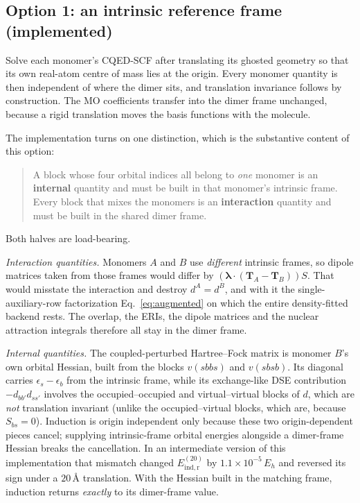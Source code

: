 \documentclass[11pt]{article}
\newcommand{\lam}{\bm{\lambda}}
\begin{document}
\subsection{Option 1: an intrinsic reference frame (implemented)}

Solve each monomer's CQED-SCF after translating its ghosted geometry so that
its own real-atom centre of mass lies at the origin. Every monomer quantity is
then independent of where the dimer sits, and translation invariance follows by
construction. The MO coefficients transfer into the dimer frame unchanged,
because a rigid translation moves the basis functions with the molecule.

The implementation turns on one distinction, which is the substantive content
of this option:

\begin{quote}
A block whose four orbital indices all belong to \emph{one} monomer is an
\textbf{internal} quantity and must be built in that monomer's intrinsic frame.
Every block that mixes the monomers is an \textbf{interaction} quantity and must
be built in the shared dimer frame.
\end{quote}

Both halves are load-bearing.

\emph{Interaction quantities.} Monomers $A$ and $B$ use \emph{different}
intrinsic frames, so dipole matrices taken from those frames would differ by
$(\lam\cdot(\bm{T}_A-\bm{T}_B))S$. That would misstate the interaction and
destroy $d^A = d^B$, and with it the single-auxiliary-row factorization
Eq.~\eqref{eq:augmented} on which the entire density-fitted backend rests. The
overlap, the ERIs, the dipole matrices and the nuclear attraction integrals
therefore all stay in the dimer frame.

\emph{Internal quantities.} The coupled-perturbed Hartree--Fock matrix is
monomer $B$'s own orbital Hessian, built from the blocks $v(sbbs)$ and
$v(sbsb)$. Its diagonal carries $\epsilon_s - \epsilon_b$ from the intrinsic
frame, while its exchange-like DSE contribution $-d_{bb'}d_{ss'}$ involves the
occupied--occupied and virtual--virtual blocks of $d$, which are \emph{not}
translation invariant (unlike the occupied--virtual blocks, which are, because
$S_{bs} = 0$). Induction is origin independent only because these two
origin-dependent pieces cancel; supplying intrinsic-frame orbital energies
alongside a dimer-frame Hessian breaks the cancellation. In an intermediate
version of this implementation that mismatch changed $E^{(20)}_{\mathrm{ind,r}}$
by $1.1\times10^{-5}\,E_h$ and reversed its sign under a $20$\,\AA{}
translation. With the Hessian built in the matching frame, induction returns
\emph{exactly} to its dimer-frame value.
\end{document}
